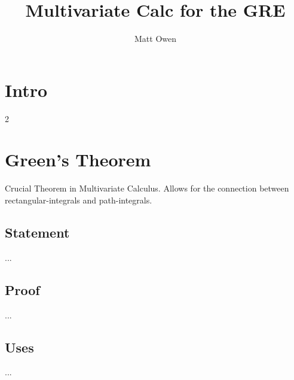 \documentclass[11pt,twoside,a4paper]{article}
\title{Multivariate Calc for the GRE}
\author{Matt Owen}
\begin{document}
\maketitle
\tableofcontents
\cleardoublepage

\section{Intro}
\label{intro}

2
%
%

\section{Green's Theorem}
\label{green-s-theorem}

Crucial Theorem in Multivariate Calculus. Allows for the connection between rectangular-integrals and path-integrals.

\subsection{Statement}
...

\subsection{Proof}
...

\subsection{Uses}
...
\end{document}
